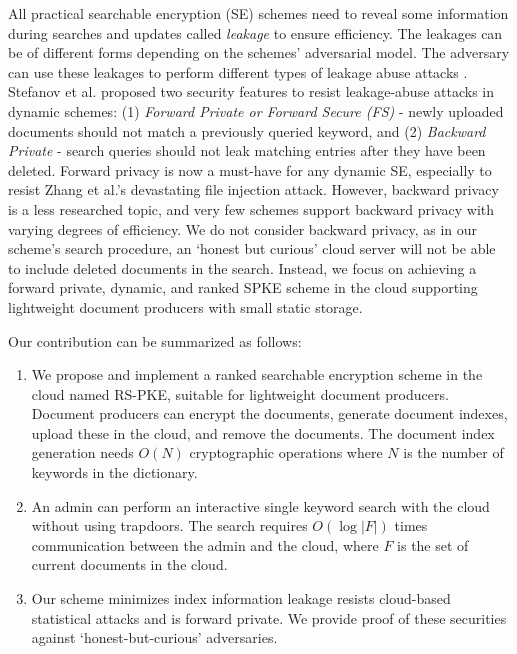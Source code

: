 \documentclass[sigconf,pdftex]{acmart}
\begin{document}
All practical searchable encryption (SE) schemes need to reveal some information during searches and updates called \textit{leakage} to ensure efficiency. The leakages can be of different forms depending on the schemes' adversarial model. The adversary can use these leakages to perform different types of leakage abuse attacks \cite{Islam2012AccessPD, cash2015leakage, 197239, blackstone2020revisiting}. Stefanov et al. \cite{stefanov2014practical} proposed two security features to resist leakage-abuse attacks in dynamic schemes: (1) \textit{Forward Private or Forward Secure (FS)} - newly uploaded documents should not match a previously queried keyword, and (2) \textit{Backward Private} - search queries should not leak matching entries after they have been deleted. Forward privacy is now a must-have for any dynamic SE, especially to resist Zhang et al.'s \cite{197239} devastating file injection attack. However, backward privacy is a less researched topic, and very few schemes support backward privacy with varying degrees of efficiency. We do not consider backward privacy, as in our scheme's search procedure, an `honest but curious' cloud server will not be able to include deleted documents in the search. Instead, we focus on achieving a forward private, dynamic, and ranked SPKE scheme in the cloud supporting lightweight document producers with small static storage.

Our contribution can be summarized as follows:

\begin{enumerate}    

\item We propose and implement a ranked searchable encryption scheme in the cloud named RS-PKE, suitable for lightweight document producers. Document producers can encrypt the documents, generate document indexes, upload these in the cloud, and remove the documents. The document index generation needs $O(N)$ cryptographic operations where $N$ is the number of keywords in the dictionary.

\item An admin can perform an interactive single keyword search with the cloud without using trapdoors. The search requires $O( \log{|F|} )$ times communication between the admin and the cloud, where $F$ is the set of current documents in the cloud.


\item Our scheme minimizes index information leakage resists cloud-based statistical attacks and is forward private. We provide proof of these securities against `honest-but-curious' adversaries.





\end{enumerate}
\end{document}
